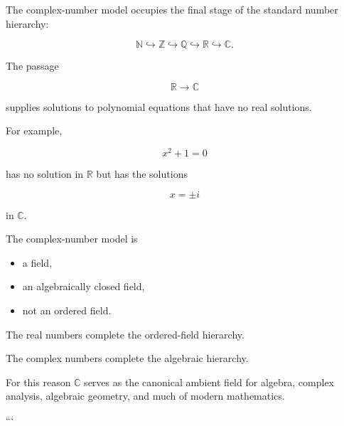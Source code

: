
\begin{remark*}

The complex-number model occupies the final stage of the standard number
hierarchy:

\[
\mathbb N
\hookrightarrow
\mathbb Z
\hookrightarrow
\mathbb Q
\hookrightarrow
\mathbb R
\hookrightarrow
\mathbb C.
\]

The passage

\[
\mathbb R
\longrightarrow
\mathbb C
\]

supplies solutions to polynomial equations that have no real solutions.

For example,

\[
x^2+1=0
\]

has no solution in $\mathbb R$ but has the solutions

\[
x=\pm i
\]

in $\mathbb C$.

\end{remark*}


\begin{remark*}

The complex-number model is

\begin{itemize}
    \item a field,
    \item an algebraically closed field,
    \item not an ordered field.
\end{itemize}

The real numbers complete the ordered-field hierarchy.

The complex numbers complete the algebraic hierarchy.

For this reason $\mathbb C$ serves as the canonical ambient field for algebra,
complex analysis, algebraic geometry, and much of modern mathematics.

\end{remark*}
```
